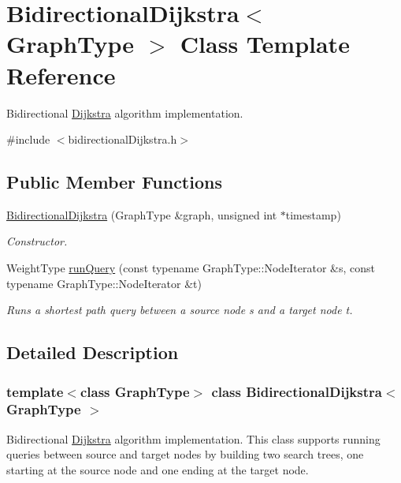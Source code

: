 \hypertarget{class_bidirectional_dijkstra}{
\section{BidirectionalDijkstra$<$ GraphType $>$ Class Template Reference}
\label{class_bidirectional_dijkstra}
}


Bidirectional \hyperlink{class_dijkstra}{Dijkstra} algorithm implementation.  




{\ttfamily \#include $<$bidirectionalDijkstra.h$>$}

\subsection*{Public Member Functions}
\begin{DoxyCompactItemize}
\item 
\hyperlink{class_bidirectional_dijkstra_a7e02bb26961a8e0dae6376f544ba402c}{BidirectionalDijkstra} (GraphType \&graph, unsigned int $\ast$timestamp)
\begin{DoxyCompactList}\small\item\em Constructor. \item\end{DoxyCompactList}\item 
WeightType \hyperlink{class_bidirectional_dijkstra_a4787798df2b6029b3613b238fc684156}{runQuery} (const typename GraphType::NodeIterator \&s, const typename GraphType::NodeIterator \&t)
\begin{DoxyCompactList}\small\item\em Runs a shortest path query between a source node s and a target node t. \item\end{DoxyCompactList}\end{DoxyCompactItemize}


\subsection{Detailed Description}
\subsubsection*{template$<$class GraphType$>$ class BidirectionalDijkstra$<$ GraphType $>$}

Bidirectional \hyperlink{class_dijkstra}{Dijkstra} algorithm implementation. This class supports running queries between source and target nodes by building two search trees, one starting at the source node and one ending at the target node.



